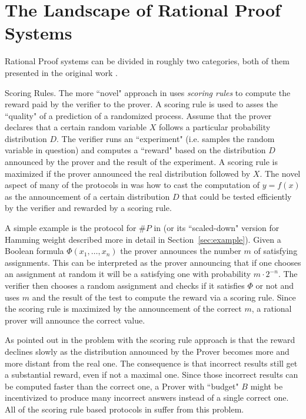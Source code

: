 
\section{The Landscape of Rational Proof Systems}

Rational Proof systems can be divided in roughly two categories, both of them presented in the original work \cite{am}. 

\medskip
\noindent
{\sc Scoring Rules.}
The more ``novel" approach in \cite{am} uses {\em scoring rules} to compute the reward paid by the verifier to the prover. A scoring rule is used to asses the ``quality" of a prediction of a randomized process. Assume that the prover declares that a certain random variable $X$ follows a particular probability distribution $D$. The verifier runs an ``experiment" (i.e. samples the random variable in question) and computes a ``reward" based on the distribution $D$ announced by the prover and the result of the experiment. A scoring rule is maximized if the prover announced the real distribution followed by $X$. The novel aspect of many of the protocols in \cite{am} was how to cast the computation of $y=f(x)$ as the announcement of a certain distribution $D$ that could be tested efficiently by the verifier and rewarded by a scoring rule. 

A simple example is the protocol for $\#P$ in \cite{am} (or its ``scaled-down" version for Hamming weight described more in detail in Section~\ref{sec:example}). Given a Boolean formula $\Phi(x_1,\ldots,x_n)$ the prover announces the number $m$ of satisfying assignments. This can be interpreted as the prover announcing that if one chooses an assignment at random it will be a satisfying one with probability $m \cdot 2^{-n}$. The verifier then chooses a random assignment and checks if it satisfies $\Phi$ or not and uses $m$ and the result of the test to compute the reward via a scoring rule. Since the scoring rule is maximized by the announcement of the correct $m$, a rational prover will announce the correct value. 

As pointed out in \cite{cg15} the problem with the scoring rule approach is that the reward declines slowly as the distribution announced by the Prover becomes more and more distant from the real one. The consequence is that incorrect results still get a substantial reward, even if not a maximal one. Since those incorrect results can be computed faster than the correct one, a Prover with ``budget" $B$ might be incentivized to produce many incorrect answers instead of a single correct one. All of the scoring rule based protocols in \cite{am,am1,ratargs,ratsumchecks} suffer from this problem. 

